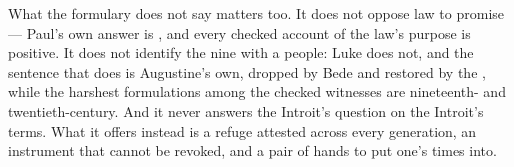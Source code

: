 What the formulary does not say matters too. It does not oppose law
to promise --- Paul's own answer is , and every checked account of
the law's purpose is positive. It does not identify the nine with a people:
Luke does not, and the sentence that does is Augustine's own, dropped by Bede
and restored by the , while the harshest formulations
among the checked witnesses are nineteenth- and twentieth-century. And it never answers the
Introit's question on the Introit's terms. What it offers instead is a refuge
attested across every generation, an instrument that cannot be revoked, and a
pair of hands to put one's times into.
